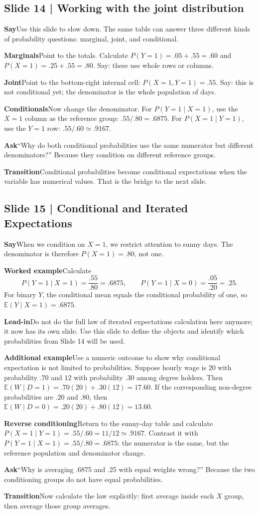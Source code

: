 \documentclass[11pt,a4paper]{article}
\newcommand{\slideheading}[1]{\subsection*{\color{accent}#1}}
\newcommand{\cue}[2]{\par\noindent\textbf{#1}\quad #2\par}
\newcommand{\E}{\mathbb{E}}
\begin{document}
\slideheading{Slide 14 | Working with the joint distribution}
\cue{Say}{Use this slide to slow down. The same table can answer three different kinds of probability questions: marginal, joint, and conditional.}
\cue{Marginals}{Point to the totals. Calculate $P(Y=1)=.05+.55=.60$ and $P(X=1)=.25+.55=.80$. Say: these use whole rows or columns.}
\cue{Joint}{Point to the bottom-right internal cell: $P(X=1,Y=1)=.55$. Say: this is not conditional yet; the denominator is the whole population of days.}
\cue{Conditionals}{Now change the denominator. For $P(Y=1\mid X=1)$, use the $X=1$ column as the reference group: $.55/.80=.6875$. For $P(X=1\mid Y=1)$, use the $Y=1$ row: $.55/.60\simeq.9167$.}
\cue{Ask}{``Why do both conditional probabilities use the same numerator but different denominators?'' Because they condition on different reference groups.}
\cue{Transition}{Conditional probabilities become conditional expectations when the variable has numerical values. That is the bridge to the next slide.}

\slideheading{Slide 15 | Conditional and Iterated Expectations}
\cue{Say}{When we condition on $X=1$, we restrict attention to sunny days. The denominator is therefore $P(X=1)=.80$, not one.}
\cue{Worked example}{Calculate \[P(Y=1\mid X=1)=\frac{.55}{.80}=.6875,\qquad P(Y=1\mid X=0)=\frac{.05}{.20}=.25.\] For binary $Y$, the conditional mean equals the conditional probability of one, so $\E(Y\mid X=1)=.6875$.}
\cue{Lead-in}{Do not do the full law of iterated expectations calculation here anymore; it now has its own slide. Use this slide to define the objects and identify which probabilities from Slide 14 will be used.}
\cue{Additional example}{Use a numeric outcome to show why conditional expectation is not limited to probabilities. Suppose hourly wage is $20$ with probability $.70$ and $12$ with probability $.30$ among degree holders. Then $\E(W\mid D=1)=.70(20)+.30(12)=17.60$. If the corresponding non-degree probabilities are $.20$ and $.80$, then $\E(W\mid D=0)=.20(20)+.80(12)=13.60$.}
\cue{Reverse conditioning}{Return to the sunny-day table and calculate $P(X=1\mid Y=1)=.55/.60=11/12\simeq.9167$. Contrast it with $P(Y=1\mid X=1)=.55/.80=.6875$: the numerator is the same, but the reference population and denominator change.}
\cue{Ask}{``Why is averaging .6875 and .25 with equal weights wrong?'' Because the two conditioning groups do not have equal probabilities.}
\cue{Transition}{Now calculate the law explicitly: first average inside each $X$ group, then average those group averages.}
\end{document}
